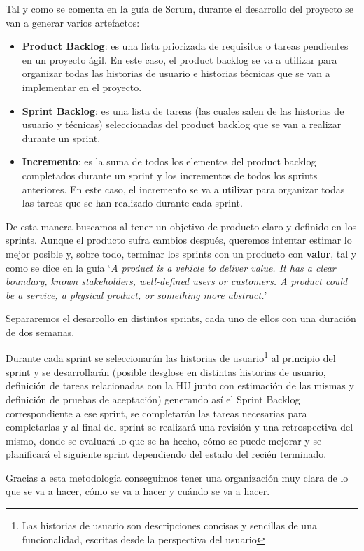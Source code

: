 Tal y como se comenta en la guía de Scrum, durante el desarrollo del proyecto se van a generar varios artefactos:
\begin{itemize}
    \item \textbf{Product Backlog}: es una lista priorizada de requisitos o tareas pendientes en un proyecto ágil. En este caso, el product backlog se va a utilizar para organizar todas las historias de usuario e historias técnicas que se van a implementar en el proyecto.
    \item \textbf{Sprint Backlog}: es una lista de tareas (las cuales salen de las historias de usuario y técnicas) seleccionadas del product backlog que se van a realizar durante un sprint.
    \item \textbf{Incremento}: es la suma de todos los elementos del product backlog completados durante un sprint y los incrementos de todos los sprints anteriores. En este caso, el incremento se va a utilizar para organizar todas las tareas que se han realizado durante cada sprint.
\end{itemize}
De esta manera buscamos al tener un objetivo de producto claro y definido en los sprints. Aunque el producto sufra cambios después, queremos intentar estimar lo mejor posible y, sobre todo, terminar los sprints con un producto con \textbf{valor}, tal y como se dice en la guía `\textit{A product is a vehicle to deliver value. It has a clear boundary, known stakeholders, well-defined users or customers. A product could be a service, a physical product, or something more abstract.}'

Separaremos el desarrollo en distintos sprints, cada uno de ellos con una duración de dos semanas.

Durante cada sprint se seleccionarán las historias de usuario\footnote{Las historias de usuario son descripciones concisas y sencillas de una funcionalidad, escritas desde la perspectiva del usuario} al principio del sprint y se desarrollarán (posible desglose en distintas historias de usuario, definición de tareas relacionadas con la HU junto con estimación de las mismas y definición de pruebas de aceptación) generando así el Sprint Backlog correspondiente a ese sprint, se completarán las tareas necesarias para completarlas y al final del sprint se realizará una revisión y una retrospectiva del mismo, donde se evaluará lo que se ha hecho, cómo se puede mejorar y se planificará el siguiente sprint dependiendo del estado del recién terminado.

Gracias a esta metodología conseguimos tener una organización muy clara de lo que se va a hacer, cómo se va a hacer y cuándo se va a hacer.

